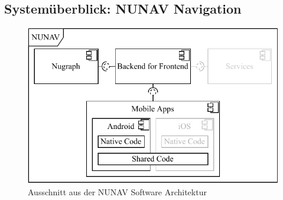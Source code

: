 \subsection{Systemüberblick: NUNAV Navigation}

\begin{figure}
    \centering
    \includegraphics{contents/06_model_evaluation/01_integration/res/nunav_architecture.pdf}
    \caption{Ausschnitt aus der NUNAV Software Architektur}
    \label{fig:nunav_software_architecture}
\end{figure}